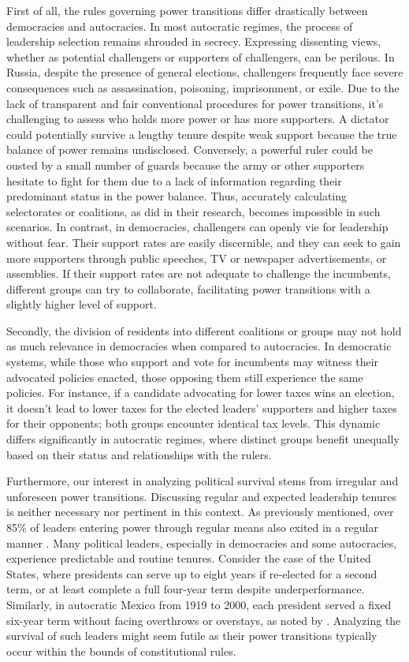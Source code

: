 \documentclass[
  12pt,
  a4paper,
  12pt]{article}
\begin{document}
First of all, the rules governing power transitions differ drastically
between democracies and autocracies. In most autocratic regimes, the
process of leadership selection remains shrouded in secrecy. Expressing
dissenting views, whether as potential challengers or supporters of
challengers, can be perilous. In Russia, despite the presence of general
elections, challengers frequently face severe consequences such as
assassination, poisoning, imprisonment, or exile. Due to the lack of
transparent and fair conventional procedures for power transitions, it's
challenging to assess who holds more power or has more supporters. A
dictator could potentially survive a lengthy tenure despite weak support
because the true balance of power remains undisclosed. Conversely, a
powerful ruler could be ousted by a small number of guards because the
army or other supporters hesitate to fight for them due to a lack of
information regarding their predominant status in the power balance.
Thus, accurately calculating selectorates or coalitions, as
\citet{buenodemesquita2003} did in their research, becomes impossible in
such scenarios. In contrast, in democracies, challengers can openly vie
for leadership without fear. Their support rates are easily discernible,
and they can seek to gain more supporters through public speeches, TV or
newspaper advertisements, or assemblies. If their support rates are not
adequate to challenge the incumbents, different groups can try to
collaborate, facilitating power transitions with a slightly higher level
of support.

Secondly, the division of residents into different coalitions or groups
may not hold as much relevance in democracies when compared to
autocracies. In democratic systems, while those who support and vote for
incumbents may witness their advocated policies enacted, those opposing
them still experience the same policies. For instance, if a candidate
advocating for lower taxes wins an election, it doesn't lead to lower
taxes for the elected leaders' supporters and higher taxes for their
opponents; both groups encounter identical tax levels. This dynamic
differs significantly in autocratic regimes, where distinct groups
benefit unequally based on their status and relationships with the
rulers.

Furthermore, our interest in analyzing political survival stems from
irregular and unforeseen power transitions. Discussing regular and
expected leadership tenures is neither necessary nor pertinent in this
context. As previously mentioned, over 85\% of leaders entering power
through regular means also exited in a regular manner
\citep{goemans2009}. Many political leaders, especially in democracies
and some autocracies, experience predictable and routine tenures.
Consider the case of the United States, where presidents can serve up to
eight years if re-elected for a second term, or at least complete a full
four-year term despite underperformance. Similarly, in autocratic Mexico
from 1919 to 2000, each president served a fixed six-year term without
facing overthrows or overstays, as noted by \citep{klesner2019}.
Analyzing the survival of such leaders might seem futile as their power
transitions typically occur within the bounds of constitutional rules.
\end{document}

